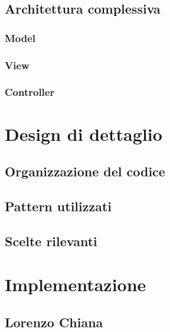         \section[Architettura]{Architettura complessiva}\label{sec:architecture}
        
            \subsection{Model}\label{subsec:architecture:model}
                
             \subsection{View}\label{subsec:architecture:view}
                
             \subsection{Controller}\label{subsec:architecture:controller}
                

    \clearpage

    \chapter{Design di dettaglio}\label{ch:details}
        
        \section{Organizzazione del codice}\label{sec:organizations}
         
         \section{Pattern utilizzati}\label{sec:pattern}
          
        \section{Scelte rilevanti}\label{sec:choices}
           
           
    \clearpage

    \chapter{Implementazione}\label{ch:implementation}
        
        \section{Lorenzo Chiana}\label{sec:chiana}
            
    
